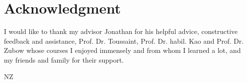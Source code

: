 
\cleardoublepage
{}
\section*{Acknowledgment}

I would like to thank my advisor Jonathan for his helpful advice, constructive feedback and assistance, Prof. Dr. Toussaint, Prof. Dr. habil. Kao and Prof. Dr. Zubow whose courses I enjoyed immensely and from whom I learned a lot, and my friends and family for their support.

\nocite{fan2020,learningToSchedule,scarl}


\begin{flushright}
NZ\\[1pc]
\end{flushright}
